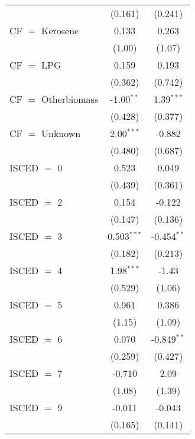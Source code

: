 \begin{table}[htbp!]
\begin{adjustbox}{width = 1\textwidth, max height = 0.95\textheight, center}
\begin{threeparttable}[b]
\begin{tabular}{lcc}
                                 & (0.161)       & (0.241)\\   
            CF $=$ Kerosene      & 0.133         & 0.263\\   
                                 & (1.00)        & (1.07)\\   
            CF $=$ LPG           & 0.159         & 0.193\\   
                                 & (0.362)       & (0.742)\\   
            CF $=$ Otherbiomass  & -1.00$^{**}$  & 1.39$^{***}$\\   
                                 & (0.428)       & (0.377)\\   
            CF $=$ Unknown       & 2.00$^{***}$  & -0.882\\   
                                 & (0.480)       & (0.687)\\   
            ISCED $=$ 0          & 0.523         & 0.049\\   
                                 & (0.439)       & (0.361)\\   
            ISCED $=$ 2          & 0.154         & -0.122\\   
                                 & (0.147)       & (0.136)\\   
            ISCED $=$ 3          & 0.503$^{***}$ & -0.454$^{**}$\\   
                                 & (0.182)       & (0.213)\\   
            ISCED $=$ 4          & 1.98$^{***}$  & -1.43\\   
                                 & (0.529)       & (1.06)\\   
            ISCED $=$ 5          & 0.961         & 0.386\\   
                                 & (1.15)        & (1.09)\\   
            ISCED $=$ 6          & 0.070         & -0.849$^{**}$\\   
                                 & (0.259)       & (0.427)\\   
            ISCED $=$ 7          & -0.710        & 2.09\\   
                                 & (1.08)        & (1.39)\\   
            ISCED $=$ 9          & -0.011        & -0.043\\   
                                 & (0.165)       & (0.141)\\   
            \midrule 

\end{tabular}
\end{threeparttable}
\end{adjustbox}
\end{table}
